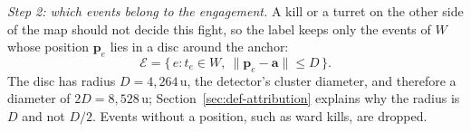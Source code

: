 \emph{Step 2: which events belong to the engagement.} A kill or a turret on the other side of the map
should not decide this fight, so the label keeps only the events of $W$ whose position $\mathbf{p}_e$
lies in a disc around the anchor:
\begin{equation}\label{eq:label-attr}
\mathcal{E} = \{\, e : t_e \in W,\ \lVert \mathbf{p}_e - \mathbf{a} \rVert \le D \,\}.
\end{equation}
The disc has radius $D = 4{,}264$\,u, the detector's cluster diameter, and therefore a diameter of
$2D = 8{,}528$\,u; Section~\ref{sec:def-attribution} explains why the radius is $D$ and not $D/2$.
Events without a position, such as ward kills, are dropped.

